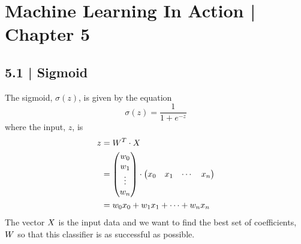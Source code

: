 \documentclass[11pt]{article}
\begin{document}
\section*{Machine Learning In Action | Chapter 5}
\subsection*{5.1 | Sigmoid}
The sigmoid, $\sigma(z)$, is given by the equation
\begin{equation*}
\sigma(z) = \frac{1}{1 + e^{-z}}
\end{equation*}
where the input, $z$, is
\begin{align*}
z &= \boldmath{W}^T\cdot\boldmath{X}\\
&= \begin{pmatrix}
w_0\\w_1\\ \vdots \\w_n
\end{pmatrix} \cdot 
\begin{pmatrix}
x_0&x_1&\cdots & x_n
\end{pmatrix}\\
&=w_0x_0 + w_1x_1 + \cdots + w_nx_n\\
\end{align*}
The vector $\boldmath X$ is the input data and we want to find the best set of coefficients, $\boldmath W$ so that this classifier is as successful as possible.
\end{document}
